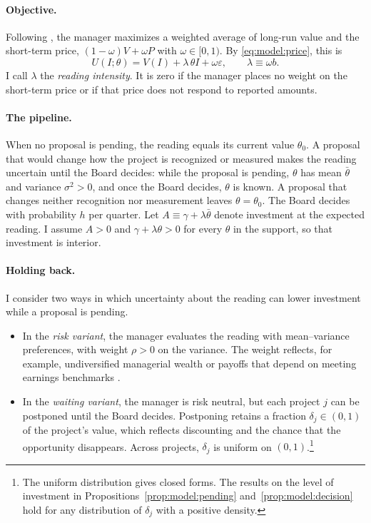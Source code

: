 \paragraph{Objective.} Following \citet{stein1989efficient}, the manager maximizes a weighted average of long-run value and the short-term price, $(1-\omega)V+\omega P$ with $\omega\in[0,1)$. By \eqref{eq:model:price}, this is
\begin{equation}\label{eq:model:objective}
  U(I;\theta)=V(I)+\lambda\,\theta I+\omega\varepsilon,\qquad \lambda\equiv\omega b.
\end{equation}
I call $\lambda$ the \emph{reading intensity}. It is zero if the manager places no weight on the short-term price or if that price does not respond to reported amounts.

\paragraph{The pipeline.} When no proposal is pending, the reading equals its current value $\theta_0$. A proposal that would change how the project is recognized or measured makes the reading uncertain until the Board decides: while the proposal is pending, $\theta$ has mean $\bar\theta$ and variance $\sigma^{2}>0$, and once the Board decides, $\theta$ is known. A proposal that changes neither recognition nor measurement leaves $\theta=\theta_0$. The Board decides with probability $h$ per quarter. Let $A\equiv\gamma+\lambda\bar\theta$ denote investment at the expected reading. I assume $A>0$ and $\gamma+\lambda\theta>0$ for every $\theta$ in the support, so that investment is interior.

\paragraph{Holding back.} I consider two ways in which uncertainty about the reading can lower investment while a proposal is pending.
\begin{itemize}
  \item In the \emph{risk variant}, the manager evaluates the reading with mean--variance preferences, with weight $\rho>0$ on the variance. The weight reflects, for example, undiversified managerial wealth or payoffs that depend on meeting earnings benchmarks \citep{graham2005economic}.
  \item In the \emph{waiting variant}, the manager is risk neutral, but each project $j$ can be postponed until the Board decides. Postponing retains a fraction $\delta_j\in(0,1)$ of the project's value, which reflects discounting and the chance that the opportunity disappears. Across projects, $\delta_j$ is uniform on $(0,1)$.\footnote{The uniform distribution gives closed forms. The results on the level of investment in Propositions~\ref{prop:model:pending} and~\ref{prop:model:decision} hold for any distribution of $\delta_j$ with a positive density.}
\end{itemize}

